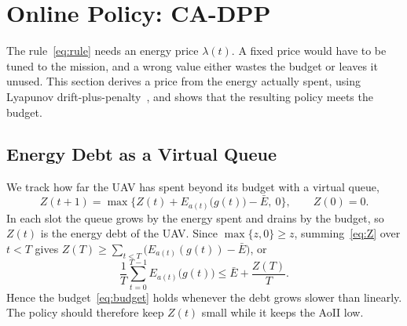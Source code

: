 \section{Online Policy: CA-DPP}\label{sec:lyap}
The rule~\eqref{eq:rule} needs an energy price $\lambda(t)$. A fixed price would have to be tuned to the mission, and a wrong value either wastes the budget or leaves it unused. This section derives a price from the energy actually spent, using Lyapunov drift-plus-penalty~\cite{neely2010book}, and shows that the resulting policy meets the budget.

\subsection{Energy Debt as a Virtual Queue}
We track how far the UAV has spent beyond its budget with a virtual queue,
\begin{equation}\label{eq:Z}
Z(t+1)=\max\Big\{Z(t)+E_{a(t)}\big(g(t)\big)-\bar E,\ 0\Big\},\qquad Z(0)=0.
\end{equation}
In each slot the queue grows by the energy spent and drains by the budget, so $Z(t)$ is the energy debt of the UAV. Since $\max\{z,0\}\ge z$, summing~\eqref{eq:Z} over $t<T$ gives $Z(T)\ge\sum_{t<T}\big(E_{a(t)}(g(t))-\bar E\big)$, or
\begin{equation}\label{eq:Zbound}
\frac1T\sum_{t=0}^{T-1}E_{a(t)}\big(g(t)\big)\le\bar E+\frac{Z(T)}{T}.
\end{equation}
Hence the budget~\eqref{eq:budget} holds whenever the debt grows slower than linearly. The policy should therefore keep $Z(t)$ small while it keeps the AoII low.

